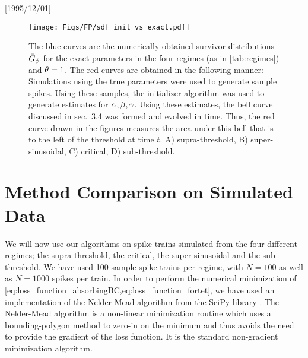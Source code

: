 \NeedsTeXFormat{LaTeX2e}[1995/12/01] \documentclass[10pt]{bmc_article}
\newenvironment{bmcformat}{\begin{raggedright}\baselineskip20pt\sloppy\setboolean{publ}{false}}{\end{raggedright}\baselineskip20pt\sloppy}
\begin{document}
\begin{bmcformat}
\begin{figure}[htp]
\begin{center}
\texttt{[image: Figs/FP/sdf\_init\_vs\_exact.pdf]}
\caption[labelInTOC]{The blue curves are the numerically obtained survivor
  distributions ${ \bar{G} }_\phi$ for the exact parameters in the four regimes (as in
  \cref{tab:regimes}) and ${\theta}=1$. The red curves are obtained in the following
  manner: Simulations using the true parameters were used to generate sample spikes.
  Using these samples, the initializer algorithm was used to generate estimates
  for ${\alpha},{\beta},{\gamma }$. Using these estimates, the bell curve discussed in sec.\ 3.4
  was formed and evolved in time. 
  Thus, the red curve drawn in the figures measures the area under
  this bell that is to the left of the threshold at time $t$. 
 A) supra-threshold, B) super-sinusoidal, C) critical, D) sub-threshold.}
  \label{fig:sdf_real_vs_init_estimated}
\end{center}
\end{figure}


\section{Method Comparison on Simulated Data}
\label{sec:method_performance}
We will now use our algorithms on spike trains simulated from the four different
regimes; the supra-threshold, the critical, the super-sinusoidal and the
sub-threshold. We have used 100 sample spike trains per regime, with $N=100$ as
well as $N=1000$ spikes per train. In order to perform the numerical
minimization of \cref{eq:loss_function_absorbingBC,eq:loss_function_fortet}, we
have used an implementation of the Nelder-Mead algorithm from the SciPy library
\cite{scipy}. The Nelder-Mead algorithm is a non-linear minimization routine
which uses a bounding-polygon method to zero-in on the minimum and thus avoids
the need to provide the gradient of the loss function. It is the standard
non-gradient minimization algorithm.


\end{bmcformat}
\end{document}
